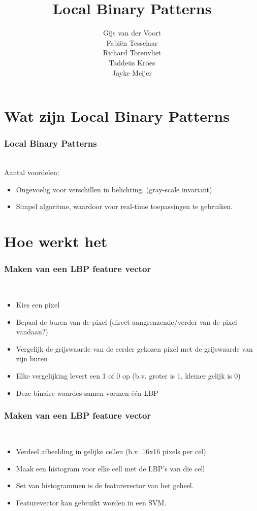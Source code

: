 \documentclass{beamer}
\author{Gijs van der Voort \\ Fabi\"en Tesselaar \\ Richard Torenvliet \\ Tadde\"us Kroes \\ Jayke Meijer}
\title{Local Binary Patterns}
\begin{document}
  \section{Wat zijn Local Binary Patterns}
		
  \begin{frame}
    \titlepage
  \end{frame}

  \begin{frame}
    \frametitle{Local Binary Patterns}
    \\
    \pause
    Aantal voordelen:
    \begin{itemize}
      \item Ongevoelig voor verschillen in belichting. (gray-scale invariant)
      \pause
      \item Simpel algoritme, waardoor voor real-time toepassingen te gebruiken.
    \end{itemize}
  \end{frame}
	
	\section{Hoe werkt het}
  
  \begin{frame}
    \frametitle{Maken van een LBP feature vector}
    \\
    \begin{itemize}
      \item Kies een pixel
      \pause
      \item Bepaal de buren van de pixel (direct aangrenzende/verder van de pixel vandaan?)
      \pause
      \item Vergelijk de grijswaarde van de eerder gekozen pixel met de grijswaarde van zijn buren
      \pause
      \item Elke vergelijking levert een 1 of 0 op (b.v. groter is 1, kleiner gelijk is 0)
      \pause
      \item Deze binaire waardes samen vormen \'e\'en LBP
    \end{itemize}
  \end{frame}
  
  \begin{frame}
    \frametitle{Maken van een LBP feature vector}
    \\
    \begin{itemize}
      \item Verdeel afbeelding in gelijke cellen (b.v. 16x16 pixels per cel)
      \pause
      \item Maak een histogram voor elke cell met de LBP's van die cell
      \pause
      \item Set van histogrammen is de featurevector van het geheel.
      \pause
      \item Featurevector kan gebruikt worden in een SVM.
    \end{itemize}
  \end{frame}
	
\end{document}
